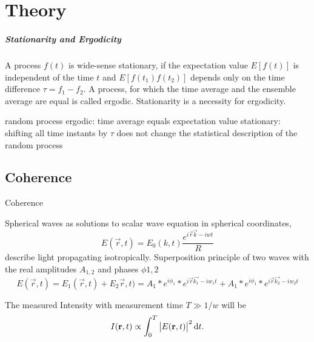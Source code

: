 \chapter{Theory}

\cite{goodman2000,goodman2007,agarwal2013,classen2017,cowley1995,born1980,trigg2005,attwood1999,griffiths2005,agarwal2013,classen2017,loudon2000,mandel1995,hanburry1956,galuber2006,baym1997,zernike1938,rosen96,yabashi2002,singer2013,santra2009,krause1979,trost2020,inoue2019,sorum1987,lajunen04,mpccd,tono2013}




\paragraph{Stationarity and Ergodicity}
A process $f(t)$ is wide-sense stationary, if the expectation value $E[f(t)]$ is independent of the time $t$ and $E[f(t_1)f(t_2)]$ depends only on the time difference $\tau=f_1-f_2$. A process, for which the time average and the ensemble average are equal is called ergodic. Stationarity is a necessity for ergodicity.

random process
ergodic: time average equals expectation value
stationary: shifting all time instants by $\tau$ does not change the statistical description of the random process 



\section{Coherence}


Coherence


Spherical waves as  solutions to scalar wave equation in spherical coordinates,
\begin{equation}
	E(\vec{r},t)=E_0(k,t) \frac{e^{i\vec{r}\vec{k}-iwt}}{R}
	\end{equation}
describe light propagating isotropically. 
Superposition principle of two waves with the real amplitudes $A_{1,2}$ and phases $\phi{1,2}$
\begin{equation}
E(\vec{r},t)=E_1(\vec{r},t)+E_2\vec{r},t)=A_1*e^{i\phi_1} * e^{i\vec{r}\vec{k_1}-iw_1t} + A_1*e^{i\phi_1} * e^{i\vec{r}\vec{k_2}-iw_2t} 
\end{equation} 

The measured Intensity with measurement time $T\gg1/w$ will be
\begin{equation}
	I(\mathbf{r},t)\propto \int_0^T \left|E(\mathbf{r},t)\right|^2 \operatorname{\mathrm{d}\!} t .
\end{equation}

